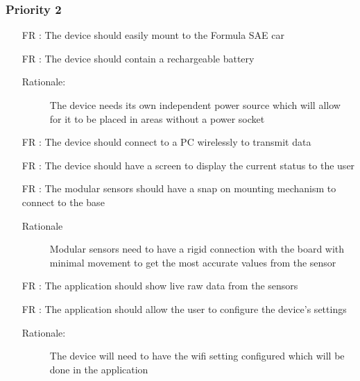 \documentclass[12pt]{article}
\newcounter{reqnum} %
\begin{document}
\subsubsection{Priority 2}
\begin{itemize}

  \item[FR \refstepcounter{reqnum}\thereqnum:] The device should easily mount to the Formula SAE car

  \item[FR \refstepcounter{reqnum}\thereqnum:] The device should contain a rechargeable battery
  \begin{description} \item[Rationale:] The device needs its own independent power source which will allow for it to be placed in areas without a power socket \end{description}

  \item[FR \refstepcounter{reqnum}\thereqnum:] The device should connect to a PC wirelessly to transmit data

  \item[FR \refstepcounter{reqnum}\thereqnum:] The device should have a screen to display the current status to the user
  
  \item[FR \refstepcounter{reqnum}\thereqnum:] The modular sensors should have a snap on mounting mechanism to connect to the base
  \begin{description} \item[Rationale] Modular sensors need to have a rigid connection with the board with minimal movement to get the most accurate values from the sensor  \end{description}

  \item[FR \refstepcounter{reqnum}\thereqnum:] The application should show live raw data from the sensors
  
  \item[FR \refstepcounter{reqnum}\thereqnum:] The application should allow the user to configure the device's settings
  \begin{description} \item[Rationale:] The device will need to have the wifi setting configured which will be done in the application \end{description}
  
  \end{itemize}
\end{document}
